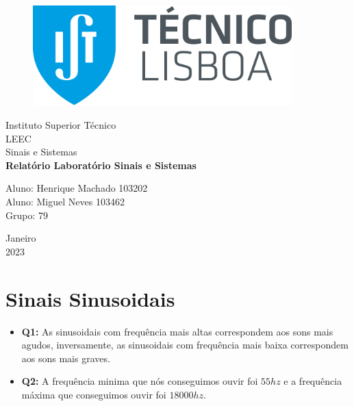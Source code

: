 \documentclass[a4paper, 12pt]{article}
\begin{document}
\begin{titlepage}
    \begin{center}

        \begin{figure}[!ht]
            \centering
            \includegraphics[width=10cm]{images/IST.png}
        \end{figure}

        \Huge{Instituto Superior Técnico}\\
        \large{LEEC}\\
        \large{Sinais e Sistemas}\\
        \vspace{15pt}
        \vspace{95pt}
        \textbf{\LARGE{Relatório Laboratório Sinais e Sistemas}}\\
        \vspace{3,5cm}
    \end{center}

    \begin{flushleft}
        \begin{tabbing}
            Aluno: Henrique Machado 103202 \\
            Aluno: Miguel Neves 103462 \\
            Grupo: 79
        \end{tabbing}
    \end{flushleft}
    \vspace{1cm}

    \begin{center}
        \vspace{\fill}
        Janeiro\\
        2023
    \end{center}
\end{titlepage}
\newpage
\tableofcontents
\thispagestyle{empty}
\newpage
{}
\section{Sinais Sinusoidais}
\begin{itemize}
    \item \textbf{Q1:} As sinusoidais com frequência mais altas correspondem aos sons mais agudos, inversamente, as sinusoidais com frequência mais baixa correspondem aos sons mais graves.
    \item \textbf{Q2:} A frequência minima que nós conseguimos ouvir foi $55hz$ e a frequência máxima que conseguimos ouvir foi $18000hz$.
\end{itemize}
\vspace{15px}
\end{document}
